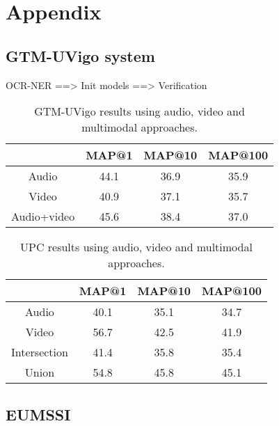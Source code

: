 \section{Appendix}

\subsection{GTM-UVigo system}

OCR-NER ==> Init models ==> Verification

\begin{table}[tb]
\centering
\begin{tabular}{c|c|c|c|}
\cline{2-4}
                                & MAP@1  & MAP@10 & MAP@100  \\ \hline
 \multicolumn{1}{|c|}{Audio} &  44.1  & 36.9   & 35.9 \\ \hline
 \multicolumn{1}{|c|}{Video} &  40.9  & 37.1   & 35.7 \\ \hline
 \multicolumn{1}{|c|}{Audio+video} & 45.6 & 38.4 & 37.0\\ \hline
 
\end{tabular}
\vspace*{-2mm}
\caption{GTM-UVigo results using audio, video and multimodal approaches.}
\vspace*{-2mm}
\label{tab:uvigo}
\end{table}

\begin{table}[tb]
\centering
\begin{tabular}{c|c|c|c|}
\cline{2-4}
                                & MAP@1  & MAP@10 & MAP@100  \\ \hline
 \multicolumn{1}{|c|}{Audio} &  40.1  & 35.1   & 34.7 \\ \hline
 \multicolumn{1}{|c|}{Video} &  56.7  & 42.5   & 41.9 \\ \hline
 \multicolumn{1}{|c|}{Intersection} & 41.4 & 35.8 & 35.4\\ \hline
 \multicolumn{1}{|c|}{Union} & 54.8 & 45.8 & 45.1\\ \hline
 
\end{tabular}
\vspace*{-2mm}
\caption{UPC results using audio, video and multimodal approaches.}
\vspace*{-2mm}
\label{tab:upc}
\end{table}


\subsection{EUMSSI}


